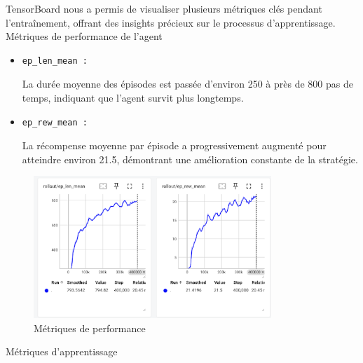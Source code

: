 \documentclass{article}
\begin{document}
    \quad TensorBoard nous a permis de visualiser plusieurs métriques clés pendant l'entraînement, offrant des insights précieux sur le processus d'apprentissage.\\

        Métriques de performance de l'agent
        
        \begin{itemize} 
            \item \begin{verbatim}ep_len_mean :\end{verbatim}La durée moyenne des épisodes est passée d'environ 250 à près de 800 pas de temps, indiquant que l'agent survit plus longtemps.
            \item \begin{verbatim}ep_rew_mean :\end{verbatim}La récompense moyenne par épisode a progressivement augmenté pour atteindre environ 21.5, démontrant une amélioration constante de la stratégie.
        \end{itemize}
        
        \begin{figure}[ht]
            \centering
            \includegraphics[width=0.8\textwidth]{7.png}
            \caption{Métriques de performance}
        \end{figure}
    
        Métriques d'apprentissage
        
\end{document}
